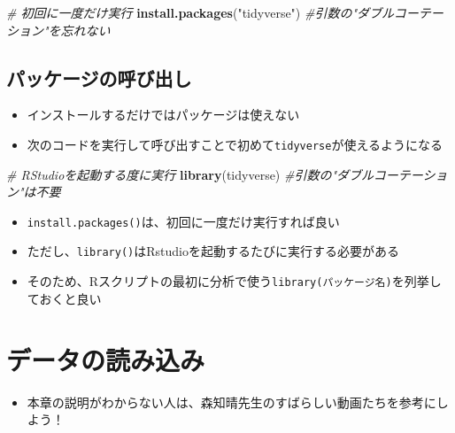 \documentclass[
]{book}
\newenvironment{Shaded}{\begin{snugshade}}{\end{snugshade}}
\newcommand{\CommentTok}[1]{\textcolor[rgb]{0.56,0.35,0.01}{\textit{#1}}}
\newcommand{\FunctionTok}[1]{\textcolor[rgb]{0.13,0.29,0.53}{\textbf{#1}}}
\newcommand{\NormalTok}[1]{#1}
\newcommand{\StringTok}[1]{\textcolor[rgb]{0.31,0.60,0.02}{#1}}
\providecommand{\tightlist}{%
  \setlength{\itemsep}{0pt}\setlength{\parskip}{0pt}}
\begin{document}
\begin{Shaded}
\begin{Highlighting}[]
\CommentTok{\# 初回に一度だけ実行}
\FunctionTok{install.packages}\NormalTok{(}\StringTok{"tidyverse"}\NormalTok{) }\CommentTok{\#引数の"ダブルコーテーション"を忘れない}
\end{Highlighting}
\end{Shaded}

\hypertarget{ux30d1ux30c3ux30b1ux30fcux30b8ux306eux547cux3073ux51faux3057}{%
\section{パッケージの呼び出し}\label{ux30d1ux30c3ux30b1ux30fcux30b8ux306eux547cux3073ux51faux3057}}

\begin{itemize}
\tightlist
\item
  インストールするだけではパッケージは使えない
\item
  次のコードを実行して呼び出すことで初めて\texttt{tidyverse}が使えるようになる
\end{itemize}

\begin{Shaded}
\begin{Highlighting}[]
\CommentTok{\# RStudioを起動する度に実行}
\FunctionTok{library}\NormalTok{(tidyverse) }\CommentTok{\#引数の"ダブルコーテーション"は不要}
\end{Highlighting}
\end{Shaded}

\begin{itemize}
\tightlist
\item
  \texttt{install.packages()}は、初回に一度だけ実行すれば良い
\item
  ただし、\texttt{library()}はRstudioを起動するたびに実行する必要がある
\item
  そのため、Rスクリプトの最初に分析で使う\texttt{library(パッケージ名)}を列挙しておくと良い
\end{itemize}

\hypertarget{ux30c7ux30fcux30bfux306eux8aadux307fux8fbcux307f}{%
\chapter{データの読み込み}\label{ux30c7ux30fcux30bfux306eux8aadux307fux8fbcux307f}}

\begin{itemize}
\tightlist
\item
  本章の説明がわからない人は、森知晴先生のすばらしい動画たちを参考にしよう！
\end{itemize}
\end{document}
